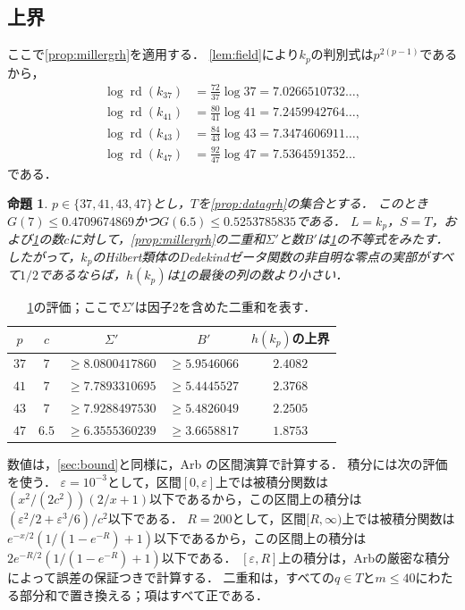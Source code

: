 \documentclass[11pt,a4paper]{ltjsarticle}
\makeatletter
\theoremstyle{ja}
\newtheorem{proposition}[theorem]{命題}
\renewenvironment{proof}[1][証明]{\par
  \pushQED{\qed}\normalfont \topsep6\p@\@plus6\p@\relax
  \trivlist
  \item[\hskip\labelsep\bfseries #1]\hspace{1\zw}\ignorespaces
}{\popQED\endtrivlist\@endpefalse}
\makeatother
\begin{document}
\subsection{上界}

ここで\cref{prop:millergrh}を適用する．
\cref{lem:field}により$k_p$の判別式は$p^{2(p-1)}$であるから，
\begin{align*}
\log \operatorname{rd}(k_{37}) &= \tfrac{72}{37} \log 37 = 7.0266510732\ldots, \\
\log \operatorname{rd}(k_{41}) &= \tfrac{80}{41} \log 41 = 7.2459942764\ldots, \\
\log \operatorname{rd}(k_{43}) &= \tfrac{84}{43} \log 43 = 7.3474606911\ldots, \\
\log \operatorname{rd}(k_{47}) &= \tfrac{92}{47} \log 47 = 7.5364591352\ldots
\end{align*}
である．

\begin{proposition} \label{prop:boundgrh}
$p \in \{37, 41, 43, 47\}$とし，$T$を\cref{prop:datagrh}の集合とする．
このとき$G(7) \le 0.4709674869$かつ$G(6.5) \le 0.5253785835$である．
$L = k_p$，$S = T$，および\cref{tab:boundgrh}の数$c$に対して，\cref{prop:millergrh}の二重和$\Sigma'$と数$B'$は\cref{tab:boundgrh}の不等式をみたす．
したがって，$k_p$のHilbert類体のDedekindゼータ関数の非自明な零点の実部がすべて$1/2$であるならば，$h(k_p)$は\cref{tab:boundgrh}の最後の列の数より小さい．
\end{proposition}

\begin{table}[ht]
\centering
\begin{tabular}{ccccc}
\toprule
$p$ & $c$ & $\Sigma'$ & $B'$ & $h(k_p)$の上界 \\
\midrule
$37$ & $7$ & $\ge 8.0800417860$ & $\ge 5.9546066$ & $2.4082$ \\
$41$ & $7$ & $\ge 7.7893310695$ & $\ge 5.4445527$ & $2.3768$ \\
$43$ & $7$ & $\ge 7.9288497530$ & $\ge 5.4826049$ & $2.2505$ \\
$47$ & $6.5$ & $\ge 6.3555360239$ & $\ge 3.6658817$ & $1.8753$ \\
\bottomrule
\end{tabular}
\caption{\cref{prop:boundgrh}の評価；ここで$\Sigma'$は因子$2$を含めた二重和を表す．}
\label{tab:boundgrh}
\end{table}

\begin{proof}
数値は，\cref{sec:bound}と同様に，Arb \cite{Jo17, Jo18}の区間演算で計算する．
積分には次の評価を使う．
$\varepsilon = 10^{-3}$として，区間$[0, \varepsilon]$上では被積分関数は$(x^2/(2c^2))(2/x + 1)$以下であるから，この区間上の積分は$(\varepsilon^2/2 + \varepsilon^3/6)/c^2$以下である．
$R = 200$として，区間$[R, \infty)$上では被積分関数は$e^{-x/2}(1/(1 - e^{-R}) + 1)$以下であるから，この区間上の積分は$2e^{-R/2}(1/(1 - e^{-R}) + 1)$以下である．
$[\varepsilon, R]$上の積分は，Arbの厳密な積分によって誤差の保証つきで計算する．
二重和は，すべての$q \in T$と$m \le 40$にわたる部分和で置き換える；項はすべて正である．
\end{proof}
\end{document}
